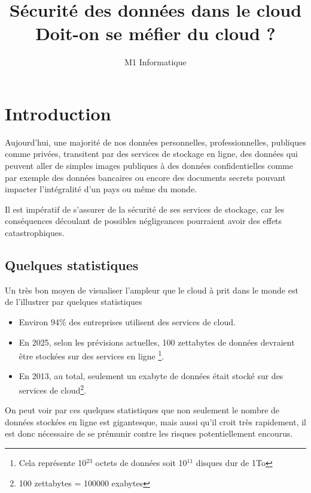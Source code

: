 \documentclass[a4paper, 12pt]{article}
\title{Sécurité des données dans le cloud\\Doit-on se méfier du cloud ?}
\author{M1 Informatique}
\date{}
\begin{document}
  \maketitle
  \newpage
  \tableofcontents
  \listoffigures
  \newpage

  \section{Introduction}
    Aujourd'hui, une majorité de nos données personnelles, professionnelles,
    publiques comme privées, transitent par des services de stockage en ligne,
    des données qui peuvent aller de simples images publiques à des données
    confidentielles comme par exemple des données bancaires ou encore des
    documents secrets pouvant impacter l'intégralité d'un pays ou même du monde.

    Il est impératif de s'assurer de la sécurité de ses services de stockage,
    car les conséquences découlant de possibles négligeances pourraient avoir
    des effets catastrophiques.

    \subsection{Quelques statistiques}
      Un très bon moyen de visualiser l'ampleur que le cloud à prit dans le
      monde est de l'illustrer par quelques statistiques
      \begin{itemize}
        \item Environ 94\% des entreprises utilisent des services de cloud.
        \item En 2025, selon les prévisions actuelles, 100 zettabytes de données
              devraient être stockées sur des services en ligne
              \footnote{Cela représente 10$^{23}$ octets de données soit
              10$^{11}$ disques dur de 1To}.
        \item En 2013, au total, seulement un exabyte de données était stocké
              sur des services de cloud\footnote{100 zettabytes = 100000 exabytes}.
      \end{itemize}

      On peut voir par ces quelques statistiques que non seulement le nombre de
      données stockées en ligne est gigantesque, mais aussi qu'il croit très
      rapidement, il est donc nécessaire de se prémunir contre les risques
      potentiellement encourus.
\end{document}
